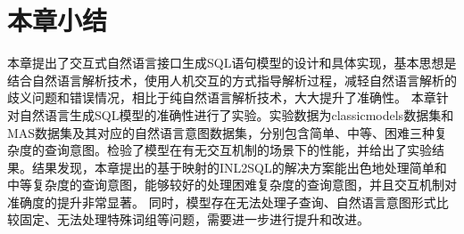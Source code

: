 \section{本章小结}
本章提出了交互式自然语言接口生成SQL语句模型的设计和具体实现，基本思想是结合自然语言解析技术，使用人机交互的方式指导解析过程，减轻自然语言解析的歧义问题和错误情况，相比于纯自然语言解析技术，大大提升了准确性。
本章针对自然语言生成SQL模型的准确性进行了实验。实验数据为classicmodels数据集和MAS数据集及其对应的自然语言意图数据集，分别包含简单、中等、困难三种复杂度的查询意图。检验了模型在有无交互机制的场景下的性能，并给出了实验结果。结果发现，本章提出的基于映射的INL2SQL的解决方案能出色地处理简单和中等复杂度的查询意图，能够较好的处理困难复杂度的查询意图，并且交互机制对准确度的提升非常显著。
同时，模型存在无法处理子查询、自然语言意图形式比较固定、无法处理特殊词组等问题，需要进一步进行提升和改进。




